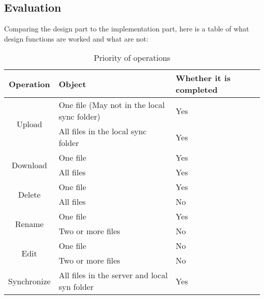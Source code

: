 \documentclass[a4paper]{article}
\begin{document}
\linespread{1.5}



\begin{flushleft}
{





}


\section{Evaluation}
Comparing the design part to the implementation part, here is a table of what design functions are worked and what are not:\newline



\begin{table}[h]
\caption{Priority of operations}
\centering
\begin{tabular}{|c|p{8cm}|p{2cm}|}
\hline
Operation & Object & Whether it is completed \\
\hline
\multirow{2}{*}{Upload}&{One file (May not in the local sync folder)}&Yes\\
\cline{2-3}
&All files in the local sync folder&Yes\\
\cline{1-3}
\multirow{2}{*}{Download}&{One file}&Yes\\
\cline{2-3}
&All files&Yes\\
\cline{1-3}
\multirow{2}{*}{Delete}&{One file}&Yes\\
\cline{2-3}
&All files&No\\
\cline{1-3}
\multirow{2}{*}{Rename}&{One file}&Yes\\
\cline{2-3}
&Two or more files&No\\
\cline{1-3}
\multirow{2}{*}{Edit}&{One file}&No\\
\cline{2-3}
&Two or more files&No\\
\cline{1-3}
\multirow{1}{*}{Synchronize}&{All files in the server and local syn folder}&Yes\\

\bottomrule
\end{tabular}
\end{table}


\end{flushleft}
\end{document}
